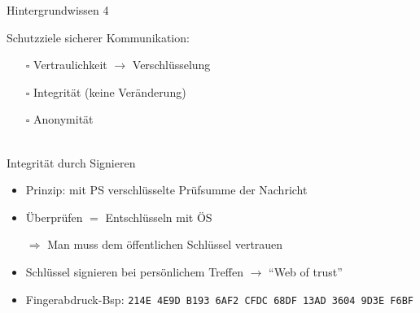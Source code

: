 \documentclass{beamer}
\begin{document}
\begin{frame}[label=bg4]{Hintergrundwissen 4}


Schutzziele sicherer Kommunikation:
  \begin{itemize}
   \item[$\square$\visible<2->{\hspace{-.67em}\raisebox{0.1em}{\scalebox{1.3}{\checkmark}}}]
   Vertraulichkeit $\rightarrow$ Verschlüsselung 
   
   \item[$\square$\visible<5->{\hspace{-.67em}\raisebox{0.1em}{\scalebox{1.3}{\checkmark}}}]
   Integrität (keine Veränderung) 
   
   \item[$\square$\scalebox{1.25}{~}] Anonymität
  \end{itemize}
  \pause
  \pause
  ~\\[3mm]
  
  
  Integrität durch Signieren
  
  \begin{itemize}
   \item Prinzip: mit PS verschlüsselte Prüfsumme der Nachricht
   \item Überprüfen $=$ Entschlüsseln mit ÖS
   \item[$\Rightarrow$] Man muss dem öffentlichen Schlüssel vertrauen\\[2mm]
   \pause
   \item Schlüssel signieren bei persönlichem Treffen $\rightarrow$ "`Web of trust"'
   \item Fingerabdruck-Bsp: {\tiny \texttt{214E 4E9D B193 6AF2 CFDC 68DF 13AD 3604 9D3E F6BF}}
  \end{itemize}

  
\end{frame}

\end{document}
